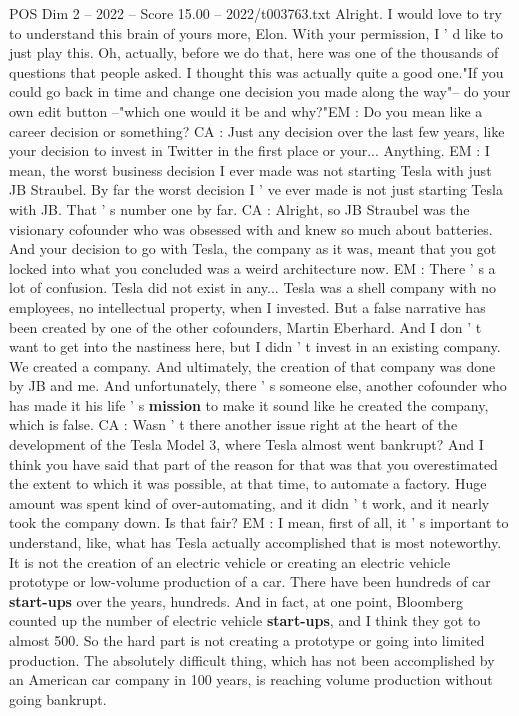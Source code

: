 \begin{textsample}{POS Dim 2 – 2022 – Score 15.00 – 2022/t003763.txt}
Alright.
I would love to try to understand this brain of yours more, Elon.
With your permission, I ' d like to just play this.
Oh, actually, before we do that, here was one of the thousands of questions that people asked.
I thought this was actually quite a good one."If you could go back in time and change one decision you made along the way"-- do your own edit button --"which one would it be and why?"EM : Do you mean like a career decision or something?
CA : Just any decision over the last few years, like your decision to invest in Twitter in the first place or your...
Anything.
EM : I mean, the worst business decision I ever made was not starting Tesla with just JB Straubel.
By far the worst decision I ' ve ever made is not just starting Tesla with JB.
That ' s number one by far.
CA : Alright, so JB Straubel was the visionary cofounder who was obsessed with and knew so much about batteries.
And your decision to go with Tesla, the company as it was, meant that you got locked into what you concluded was a weird architecture now.
EM : There ' s a lot of confusion.
Tesla did not exist in any...
Tesla was a shell company with no employees, no intellectual property, when I invested.
But a false narrative has been created by one of the other cofounders, Martin Eberhard.
And I don ' t want to get into the nastiness here, but I didn ' t invest in an existing company.
We created a company.
And ultimately, the creation of that company was done by JB and me.
And unfortunately, there ' s someone else, another cofounder who has made it his life ' s \textbf{mission} to make it sound like he created the company, which is false.
CA : Wasn ' t there another issue right at the heart of the development of the Tesla Model 3, where Tesla almost went bankrupt?
And I think you have said that part of the reason for that was that you overestimated the extent to which it was possible, at that time, to automate a factory.
Huge amount was spent kind of over-automating, and it didn ' t work, and it nearly took the company down.
Is that fair?
EM : I mean, first of all, it ' s important to understand, like, what has Tesla actually accomplished that is most noteworthy.
It is not the creation of an electric vehicle or creating an electric vehicle prototype or low-volume production of a car.
There have been hundreds of car \textbf{start-ups} over the years, hundreds.
And in fact, at one point, Bloomberg counted up the number of electric vehicle \textbf{start-ups}, and I think they got to almost 500.
So the hard part is not creating a prototype or going into limited production.
The absolutely difficult thing, which has not been accomplished by an American car company in 100 years, is reaching volume production without going bankrupt.

\end{textsample}
